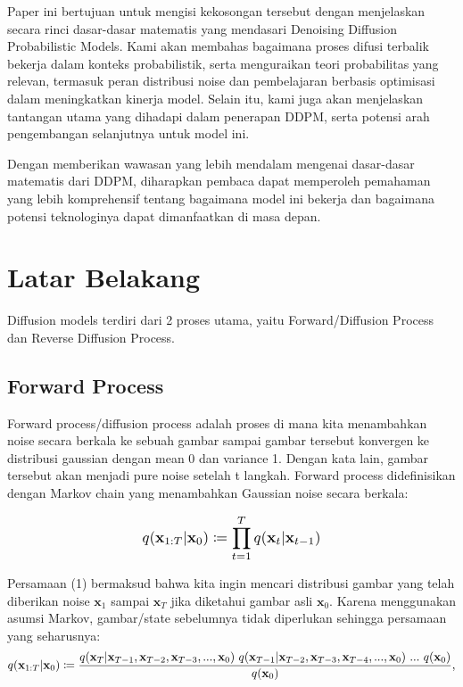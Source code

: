 \documentclass{article}
\newcommand*{\Scale}[2][4]{\scalebox{#1}{\ensuremath{#2}}}
\begin{document}
Paper ini bertujuan untuk mengisi kekosongan tersebut dengan menjelaskan secara rinci dasar-dasar matematis yang mendasari Denoising Diffusion Probabilistic Models. Kami akan membahas bagaimana proses difusi terbalik bekerja dalam konteks probabilistik, serta menguraikan teori probabilitas yang relevan, termasuk peran distribusi noise dan pembelajaran berbasis optimisasi dalam meningkatkan kinerja model. Selain itu, kami juga akan menjelaskan tantangan utama yang dihadapi dalam penerapan DDPM, serta potensi arah pengembangan selanjutnya untuk model ini.

Dengan memberikan wawasan yang lebih mendalam mengenai dasar-dasar matematis dari DDPM, diharapkan pembaca dapat memperoleh pemahaman yang lebih komprehensif tentang bagaimana model ini bekerja dan bagaimana potensi teknologinya dapat dimanfaatkan di masa depan.


\section{Latar Belakang}


Diffusion models terdiri dari 2 proses utama, yaitu Forward/Diffusion Process dan Reverse Diffusion Process.


\subsection{Forward Process}


Forward process/diffusion process adalah proses di mana kita menambahkan noise secara berkala ke sebuah gambar sampai gambar tersebut konvergen ke distribusi gaussian dengan mean 0 dan variance 1. Dengan kata lain, gambar tersebut akan menjadi pure noise setelah t langkah. Forward process didefinisikan dengan Markov chain yang menambahkan Gaussian noise secara berkala:

\begin{equation}
\Scale[1.2]{ \displaystyle
q(\textbf{x}_{1:T}|\textbf{x}_{0}) \coloneq \displaystyle \prod_{t=1}^{T} q(\textbf{x}_{t}|\textbf{x}_{t-1}) }
\end{equation}

Persamaan (1) bermaksud bahwa kita ingin mencari distribusi gambar yang telah diberikan noise $ \textbf{x}_{1} $ sampai $ \textbf{x}_{T} $ jika diketahui gambar asli $ \textbf{x}_{0} $. Karena menggunakan asumsi Markov, gambar/state sebelumnya tidak diperlukan sehingga persamaan yang seharusnya:
\begin{equation}
\Scale[1.2]{ \displaystyle
q(\textbf{x}_{1:T}|\textbf{x}_{0}) \coloneq  \frac{q(\textbf{x}_{T}|\textbf{x}_{T-1},\textbf{x}_{T-2},\textbf{x}_{T-3},...,\textbf{x}_{0}) \ q(\textbf{x}_{T-1}|\textbf{x}_{T-2},\textbf{x}_{T-3},\textbf{x}_{T-4},...,\textbf{x}_{0}) \ ... \ q(\textbf{x}_{0})  } {  q(\textbf{x}_{0}) }, }
\end{equation}
\end{document}

